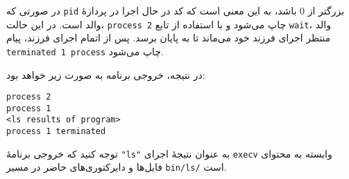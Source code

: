 \begin{qsolve}
\begin{enumerate}
		
	
در صورتی که \texttt{pid} بزرگتر از 0 باشد، به این معنی است که کد در حال اجرا در پردازهٔ والد است. در این حالت، \texttt{process 2} چاپ می‌شود و با استفاده از تابع \texttt{wait}، والد منتظر اجرای فرزند خود می‌ماند تا به پایان برسد. پس از اتمام اجرای فرزند، پیام 
\texttt{terminated 1 process}
چاپ می‌شود.

در نتیجه، خروجی برنامه به صورت زیر خواهد بود:
\begin{latin}
	\texttt{process 2}\\
	\texttt{process 1}\\
	\texttt{<ls results of program>}\\
	\texttt{process 1 terminated}\\
\end{latin}

توجه کنید که خروجی برنامهٔ \texttt{"ls"} به عنوان نتیجهٔ اجرای \texttt{execv} وابسته به محتوای فایل‌ها و دایرکتوری‌های حاضر در مسیر \texttt{bin/ls/} است.
		
		
	\end{enumerate}
\end{qsolve}